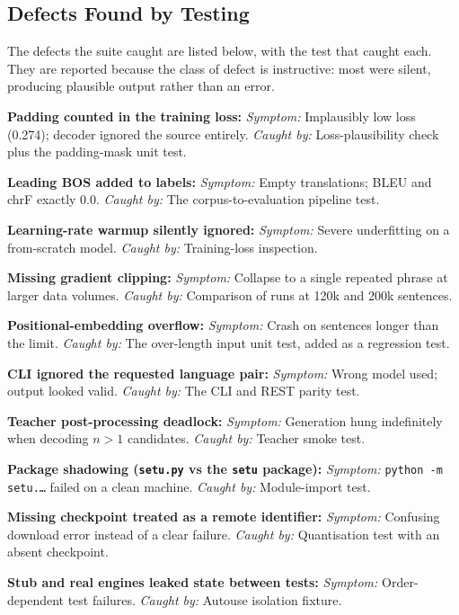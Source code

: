 \subsection{Defects Found by Testing}
\label{subsec:defects}

The defects the suite caught are listed below, with the test that caught
each. They are reported because the class of defect is instructive: most
were silent, producing plausible output rather than an error.

\begin{bullets}
\item \textbf{Padding counted in the training loss:} \emph{Symptom:} Implausibly low loss (0.274); decoder ignored the source entirely. \emph{Caught by:} Loss-plausibility check plus the padding-mask unit test.
\item \textbf{Leading BOS added to labels:} \emph{Symptom:} Empty translations; BLEU and chrF exactly 0.0. \emph{Caught by:} The corpus-to-evaluation pipeline test.
\item \textbf{Learning-rate warmup silently ignored:} \emph{Symptom:} Severe underfitting on a from-scratch model. \emph{Caught by:} Training-loss inspection.
\item \textbf{Missing gradient clipping:} \emph{Symptom:} Collapse to a single repeated phrase at larger data volumes. \emph{Caught by:} Comparison of runs at 120k and 200k sentences.
\item \textbf{Positional-embedding overflow:} \emph{Symptom:} Crash on sentences longer than the limit. \emph{Caught by:} The over-length input unit test, added as a regression test.
\item \textbf{CLI ignored the requested language pair:} \emph{Symptom:} Wrong model used; output looked valid. \emph{Caught by:} The CLI and REST parity test.
\item \textbf{Teacher post-processing deadlock:} \emph{Symptom:} Generation hung indefinitely when decoding $n>1$ candidates. \emph{Caught by:} Teacher smoke test.
\item \textbf{Package shadowing (\texttt{setu.py} vs the \texttt{setu} package):} \emph{Symptom:} \texttt{python -m setu.\dots} failed on a clean machine. \emph{Caught by:} Module-import test.
\item \textbf{Missing checkpoint treated as a remote identifier:} \emph{Symptom:} Confusing download error instead of a clear failure. \emph{Caught by:} Quantisation test with an absent checkpoint.
\item \textbf{Stub and real engines leaked state between tests:} \emph{Symptom:} Order-dependent test failures. \emph{Caught by:} Autouse isolation fixture.
\end{bullets}

